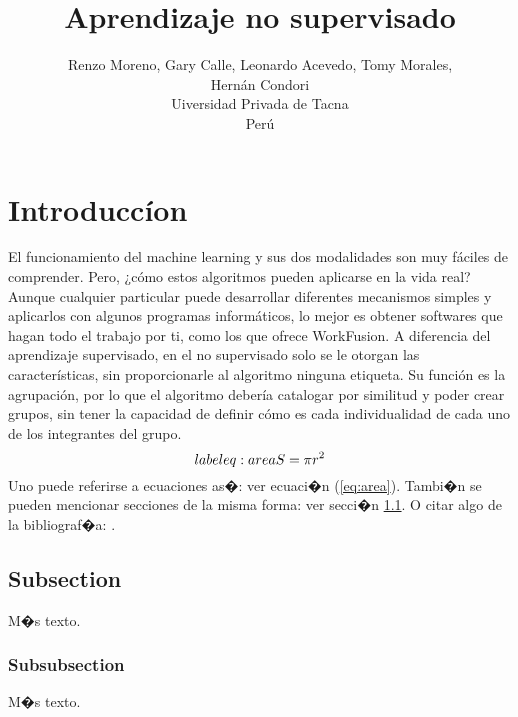\documentclass{article}
\title{Aprendizaje no supervisado}
\author{Renzo Moreno, Gary Calle, Leonardo Acevedo, Tomy Morales,\\ Hern\'an Condori \\
  \small Uiversidad Privada de Tacna\\
  \small Per\'u
}
\theoremstyle{definition}
\theoremstyle{remark}
\begin{document}
\maketitle


\section{Introducc\'ion}

El funcionamiento del machine learning y sus dos modalidades son muy fáciles de comprender. Pero, ¿cómo estos algoritmos pueden aplicarse en la vida real? Aunque cualquier particular puede desarrollar diferentes mecanismos simples y aplicarlos con algunos programas informáticos, lo mejor es obtener softwares que hagan todo el trabajo por ti, como los que ofrece WorkFusion.
A diferencia del aprendizaje supervisado, en el no supervisado solo se le otorgan las características, sin proporcionarle al algoritmo ninguna etiqueta. Su función es la agrupación, por lo que el algoritmo debería catalogar por similitud y poder crear grupos, sin tener la capacidad de definir cómo es cada individualidad de cada uno de los integrantes del grupo.
\begin{equation}\\label{eq:area}
  S = \pi r^2
\end{equation}
Uno puede referirse a ecuaciones as�: ver ecuaci�n (\ref{eq:area}).
Tambi�n se pueden mencionar secciones de la misma forma: ver secci�n
\ref{sec:nada}. O citar algo de la bibliograf�a: \cite{Cd94}.

\subsection{Subsection}\label{sec:nada}

M�s texto.

\subsubsection{Subsubsection}\label{sec:nada2}

M�s texto.
\end{document}
